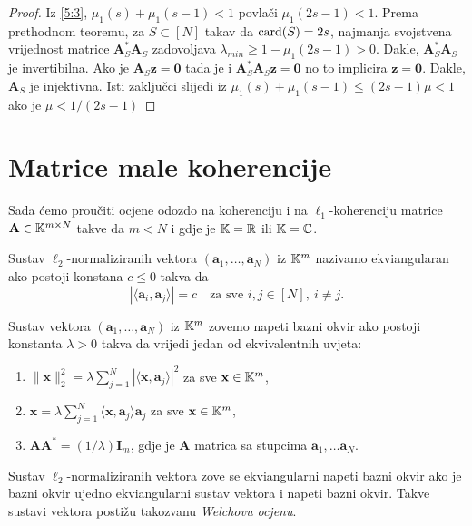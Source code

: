 \documentclass[a4paper,twoside,12pt]{memoir} %
\newcommand{\vect}[1]{\mathbf{#1}}
\renewcommand{\vec}{\vect}
\newcommand{\card}{\text{\normalfont{card}}}
\newcommand{\norm}[1]{\|{#1}\|}
\begin{document}
\begin{proof}
    Iz \eqref{5:3}, $\mu_1(s) + \mu_1(s-1) < 1$ povla\v{c}i $\mu_1(2s-1) < 1$. Prema prethodnom teoremu, za $S \subset [N]$ takav da $\card(S) = 2s$, najmanja svojstvena vrijednost matrice $\vec A^*_S \vec A_S$ zadovoljava $\lambda_{min} \geq 1 - \mu_1(2s-1)>0$. Dakle, $\vec A^*_S \vec A_S$ je invertibilna. Ako je $\vec A_S \vec z = \vec 0$ tada je i $\vec A^*_S \vec A_S \vec z = \vec 0$ no to implicira $\vec z = \vec 0$. Dakle, $\vec A_S$ je injektivna. Isti zaklju\v{c}ci slijedi iz $\mu_1(s) + \mu_1(s-1) \leq (2s-1)\mu < 1$ ako je $\mu < 1/(2s-1)$
\end{proof}

\section[Matrice male koherencije][Matrice male koherencije]{Matrice male koherencije}
Sada \'cemo prou\v{c}iti ocjene odozdo na koherenciju i na $\ell_1$-koherenciju matrice $\vec A \in \K^{m \times N}$ takve da $m < N$ i gdje je $\mathbb{K} = \mathbb{R}$ ili $\mathbb{K} = \mathbb{C}$.
\begin{defn}
    Sustav $\ell_2$-normaliziranih vektora $(\vec a_1, \dots, \vec a_N)$ iz $\mathbb{K}^m$ nazivamo ekviangularan ako postoji konstana $c \leq 0$ takva da
    \begin{equation*}
        |\langle \vec a_i, \vec a_j \rangle|  = c \quad \text{za sve } i,j \in [N],\ i \neq j.
    \end{equation*}
\end{defn}
\begin{defn}
    Sustav  vektora $(\vec a_1, \dots, \vec a_N)$ iz $\mathbb{K}^m$ zovemo napeti bazni okvir ako postoji konstanta $\lambda > 0$ takva da vrijedi jedan od ekvivalentnih uvjeta:
    \begin{enumerate}[label=(\alph*)]
        \item $\norm{\vec x}_2^2 = \lambda \sum_{j=1}^N |\langle \vec x, \vec a_j \rangle|^2$ za sve $\vec x \in \K^m$,
        \item $\vec{x} = \lambda \sum_{j=1}^N \langle \vec x, \vec a_j\rangle \vec a_j$  za sve $\vec x \in \K^m$,
        \item $\vec{AA}^* = (1/\lambda) \vec I_m$, gdje je $\vec A$ matrica sa stupcima $\vec a_1, \dots \vec a_N$.
    \end{enumerate}
\end{defn}
Sustav $\ell_2$-normaliziranih vektora zove se ekviangularni napeti bazni okvir ako je bazni okvir ujedno ekviangularni sustav vektora i napeti bazni okvir. Takve sustavi vektora posti\v{z}u takozvanu \textit{Welchovu ocjenu}.
\end{document}
